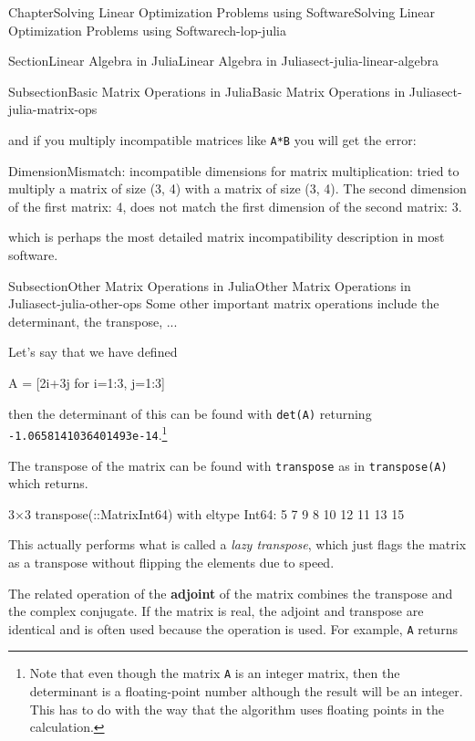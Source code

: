 \documentclass[oneside,10pt,]{book}
\newcommand{\mono}[1]{\texttt{#1}}
\newcommand{\terminology}[1]{\textbf{#1}}
\numberwithin{equation}{section}
\begin{document}
\begin{chapterptx}{Chapter}{Solving Linear Optimization Problems using Software}{}{Solving Linear Optimization Problems using Software}{}{}{ch-lop-julia}
\begin{sectionptx}{Section}{Linear Algebra in Julia}{}{Linear Algebra in Julia}{}{}{sect-julia-linear-algebra}
\begin{subsectionptx}{Subsection}{Basic Matrix Operations in Julia}{}{Basic Matrix Operations in Julia}{}{}{sect-julia-matrix-ops}
%
\par
and if you multiply incompatible matrices like \mono{A*B} you will get the error:%
\par
%
\begin{codedisplay}
DimensionMismatch: incompatible dimensions for matrix multiplication: tried to multiply a matrix of size (3, 4) with a matrix of size (3, 4). The second dimension of the first matrix: 4, does not match the first dimension of the second matrix: 3.
\end{codedisplay}
%
\par
which is perhaps the most detailed matrix incompatibility description in most software.%
\end{subsectionptx}
%
%
\typeout{************************************************}
\typeout{************************************************}
%
\begin{subsectionptx}{Subsection}{Other Matrix Operations in Julia}{}{Other Matrix Operations in Julia}{}{}{sect-julia-other-ops}
Some other important matrix operations include the determinant, the transpose, ...%
\par
Let's say that we have defined%
\par
%
\begin{codedisplay}
A = [2i+3j for i=1:3, j=1:3]
\end{codedisplay}
%
\par
then the determinant of this can be found with \mono{det(A)} returning \mono{-1.0658141036401493e-14}.\footnote{Note that even though the matrix \mono{A} is an integer matrix, then the determinant is a floating-point number although the result will be an integer. This has to do with the way that the algorithm uses floating points in the calculation.\label{sect-julia-other-ops-5-3}}%
\par
The transpose of the matrix can be found with \mono{transpose} as in \mono{transpose(A)} which returns.%
\par
%
\begin{codedisplay}
3×3 transpose(::Matrix{Int64}) with eltype Int64:
  5   7   9
  8  10  12
 11  13  15
\end{codedisplay}
%
\par
This actually performs what is called a \emph{lazy transpose}, which just flags the matrix as a transpose without flipping the elements due to speed.%
\par
The related operation of the \terminology{adjoint} of the matrix combines the transpose and the complex conjugate. If the matrix is real, the adjoint and transpose are identical and is often used because the operation \mono{\textquotesingle{}} is used. For example, \mono{A\textquotesingle{}} returns%

\end{subsectionptx}
\end{sectionptx}
\end{chapterptx}
\end{document}
